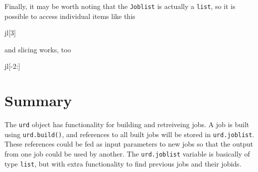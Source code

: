 Finally, it may be worth noting that the \texttt{Joblist} is actually
a \texttt{list}, so it is possible to access individual items like
this
\begin{python}
jl[3]
\end{python}
and slicing works, too
\begin{python}
jl[-2:]
\end{python}


\section{Summary}
The \texttt{urd} object has functionality for building and retreiveing
jobs.  A job is built using \texttt{urd.build()}, and references to
all built jobs will be stored in \texttt{urd.joblist}.  These
references could be fed as input parameters to new jobs so that the
output from one job could be used by another.
The \texttt{urd.joblist} variable is basically of type \texttt{list},
but with extra functionality to find previous jobs and their jobids.
